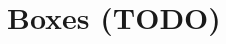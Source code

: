 \documentclass[]{article}
\begin{document}










\newpage

\section{Boxes (TODO)}
\end{document}

